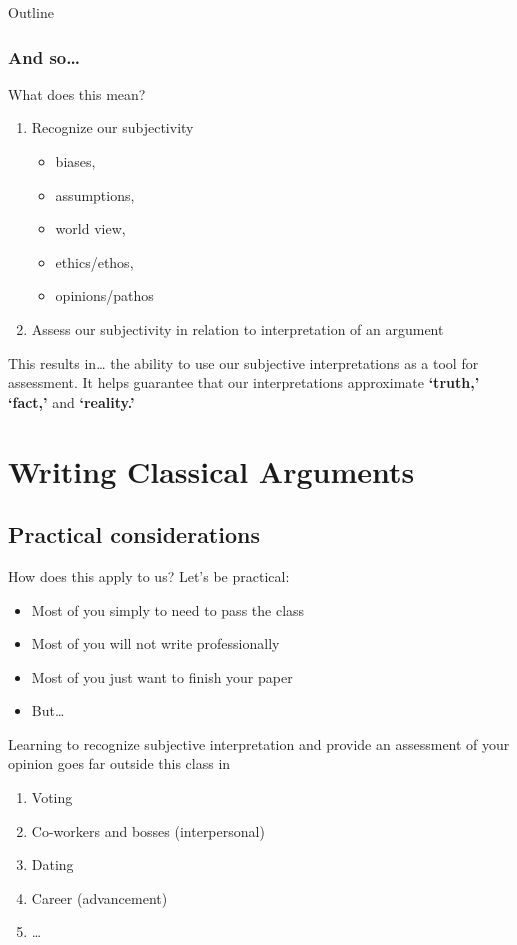 \documentclass{beamer}
\begin{document}
\begin{frame}{Outline}
\subsubsection{And so\dots}
\begin{frame}{What does this mean?}
\begin{enumerate}
\item Recognize our subjectivity \begin{itemize} \item biases, \item assumptions, \item world view, \item ethics/ethos, \item opinions/pathos
\end{itemize}
\item Assess our subjectivity in relation to interpretation of an argument
\end{enumerate}
\begin{exampleblock}{This results in\dots}
\pause
the ability to use our subjective interpretations as a tool for assessment. It helps guarantee that our interpretations approximate {\bf `truth,' `fact,'} and {\bf `reality.'} 
\end{exampleblock}
\end{frame}


\section{Writing Classical Arguments}

\subsection{Practical considerations}
\begin{frame}{How does this apply to us?}
Let's be practical:\pause
\begin{itemize}[<+-| alert@+>]
\item Most of you simply to need to pass the class
\item Most of you will not write professionally
\item Most of you just want to finish your paper
\item But\dots
\end{itemize}
\pause Learning to recognize subjective interpretation and provide an assessment of your opinion goes far outside this class in\pause
\begin{enumerate}
\item<+-> Voting
\item<+-> Co-workers and bosses (interpersonal)
\item<+-> Dating
\item<+-> Career (advancement)
\item<+-> \ldots
\end{enumerate}
\end{frame}\label{Application}



\end{frame}
\end{document}
